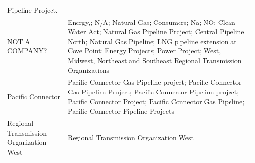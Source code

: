\documentclass[]{article}
\newenvironment{Shaded}{\begin{snugshade}}{\end{snugshade}}
\newcommand{\KeywordTok}[1]{\textcolor[rgb]{0.13,0.29,0.53}{\textbf{#1}}}
\newcommand{\DataTypeTok}[1]{\textcolor[rgb]{0.13,0.29,0.53}{#1}}
\newcommand{\DecValTok}[1]{\textcolor[rgb]{0.00,0.00,0.81}{#1}}
\newcommand{\StringTok}[1]{\textcolor[rgb]{0.31,0.60,0.02}{#1}}
\newcommand{\CommentTok}[1]{\textcolor[rgb]{0.56,0.35,0.01}{\textit{#1}}}
\newcommand{\OperatorTok}[1]{\textcolor[rgb]{0.81,0.36,0.00}{\textbf{#1}}}
\newcommand{\NormalTok}[1]{#1}
\begin{document}
\begin{longtable}[]{@{}ll@{}}
Pipeline Project.\tabularnewline
NOT A COMPANY? & Energy,; N/A; Natural Gas; Consumers; Na; NO; Clean
Water Act; Natural Gas Pipeline Project; Central Pipeline North; Natural
Gas Pipeline; LNG pipeline extension at Cove Point; Energy Projects;
Power Project; West, Midwest, Northeast and Southeast Regional
Transmission Organizations\tabularnewline
Pacific Connector & Pacific Connector Gas Pipeline project; Pacific
Connector Gas Pipeline Project; Pacific Connector Pipeline project;
Pacific Connector Project; Pacific Connector Gas Pipeline; Pacific
Connector Pipeline Projects\tabularnewline
Regional Transmission Organization West & Regional Transmission
Organization West\tabularnewline
\bottomrule
\end{longtable}

\begin{Shaded}
\end{Shaded}
\end{document}
